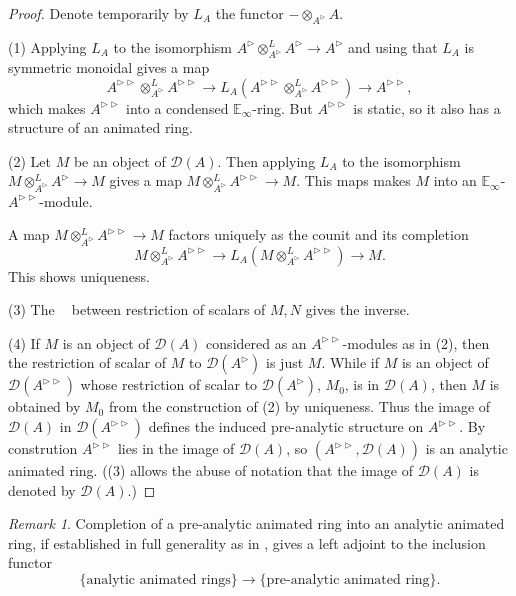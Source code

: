 \documentclass{article}
\theoremstyle{plain}
\theoremstyle{definition}
\theoremstyle{remark}
\newtheorem{rmk}[thm]{Remark}
\DeclareMathOperator{\rhoms}{\underline{RHom}}
\newcommand{\dten}{\otimes ^{L}}
\newcommand{\huflag}{\triangleright}
\newcommand{\D}{\mathcal{D}}
\begin{document}
\begin{proof}
Denote temporarily by $ L _{A} $ the functor $ -\otimes _{A ^{\huflag}} A $.

(1)
Applying $ L _{A} $ to the isomorphism $ A ^{\huflag}\dten _{A ^{\huflag}} A ^{\huflag} \to A ^{\huflag} $
and using that $ L _{A} $ is symmetric monoidal gives a map 
$$ A ^{\huflag\huflag}\dten _{A ^{\huflag}} A ^{\huflag\huflag}\to L _{A} (A ^{\huflag\huflag} \dten _{A ^{\huflag}} A ^{\huflag\huflag})
\to A ^{\huflag\huflag}, $$
which makes $ A ^{\huflag\huflag} $ into a condensed $ \mathbb{E}_{\infty} $-ring.
But $ A ^{\huflag\huflag} $ is static, so it also has a structure of an animated ring.

(2)
Let $ M $ be an object of $ \D (A) $. Then applying $ L _{A} $ to the isomorphism $ M\dten _{A ^{\huflag}} A ^{\huflag}\to M $ gives a map
$ M \dten _{A ^{\huflag}} A ^{\huflag\huflag}\to M $.
This maps makes $ M $ into an $ \mathbb{E}_{\infty} $-$ A ^{\huflag\huflag} $-module.

A map $ M\dten _{A ^{\huflag}} A ^{\huflag\huflag} \to M $ factors uniquely as the counit and its completion
$$M \dten _{A ^{\huflag}}A ^{\huflag\huflag}\to L _{A}(M \dten _{A ^{\huflag}} A ^{\huflag\huflag}) \to M .$$
This shows uniqueness.

(3)
The $ \rhoms $ between restriction of scalars of $ M, N $ gives the inverse.

(4)
If $ M $ is an object of $ \D (A) $ considered as an $ A ^{\huflag\huflag} $-modules as in (2),
then the restriction of scalar of $ M $ to $ \D (A ^{\huflag}) $ is just $ M $.
While if $ M $ is an object of $ \D (A ^{\huflag\huflag}) $ whose restriction of scalar to $ \D (A ^{\huflag}) $, $ M _{0} $,
is in $ \D (A) $, then $ M $ is obtained by $ M _{0} $ from the construction of (2) by uniqueness.
Thus the image of $ \D (A) $ in $ \D (A ^{\huflag\huflag}) $ defines the induced pre-analytic structure on $ A ^{\huflag\huflag} $.
By constrution $ A ^{\huflag\huflag} $ lies in the image of $ \D (A) $,
so $ (A ^{\huflag\huflag}, \D (A)) $ is an analytic animated ring.
((3) allows the abuse of notation that the image of $ \D (A) $ is denoted by $ \D (A) $.)
\end{proof}

\begin{rmk}
Completion of a pre-analytic animated ring into an analytic animated ring,
if established in full generality as in \cite{rodriguez-camargo_notes_nodate},
gives a left adjoint to the inclusion functor
\begin{equation*}
\{\text{analytic animated rings}\}\to \{\text{pre-analytic animated ring}\}.
\end{equation*}
\end{rmk}
\end{document}
